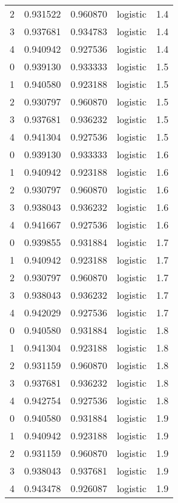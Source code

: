 \begin{tabular}{rrrlr}
     2 & 0.931522 & 0.960870 & logistic &        1.4 \\
     3 & 0.937681 & 0.934783 & logistic &        1.4 \\
     4 & 0.940942 & 0.927536 & logistic &        1.4 \\
     0 & 0.939130 & 0.933333 & logistic &        1.5 \\
     1 & 0.940580 & 0.923188 & logistic &        1.5 \\
     2 & 0.930797 & 0.960870 & logistic &        1.5 \\
     3 & 0.937681 & 0.936232 & logistic &        1.5 \\
     4 & 0.941304 & 0.927536 & logistic &        1.5 \\
     0 & 0.939130 & 0.933333 & logistic &        1.6 \\
     1 & 0.940942 & 0.923188 & logistic &        1.6 \\
     2 & 0.930797 & 0.960870 & logistic &        1.6 \\
     3 & 0.938043 & 0.936232 & logistic &        1.6 \\
     4 & 0.941667 & 0.927536 & logistic &        1.6 \\
     0 & 0.939855 & 0.931884 & logistic &        1.7 \\
     1 & 0.940942 & 0.923188 & logistic &        1.7 \\
     2 & 0.930797 & 0.960870 & logistic &        1.7 \\
     3 & 0.938043 & 0.936232 & logistic &        1.7 \\
     4 & 0.942029 & 0.927536 & logistic &        1.7 \\
     0 & 0.940580 & 0.931884 & logistic &        1.8 \\
     1 & 0.941304 & 0.923188 & logistic &        1.8 \\
     2 & 0.931159 & 0.960870 & logistic &        1.8 \\
     3 & 0.937681 & 0.936232 & logistic &        1.8 \\
     4 & 0.942754 & 0.927536 & logistic &        1.8 \\
     0 & 0.940580 & 0.931884 & logistic &        1.9 \\
     1 & 0.940942 & 0.923188 & logistic &        1.9 \\
     2 & 0.931159 & 0.960870 & logistic &        1.9 \\
     3 & 0.938043 & 0.937681 & logistic &        1.9 \\
     4 & 0.943478 & 0.926087 & logistic &        1.9 \\

\end{tabular}
